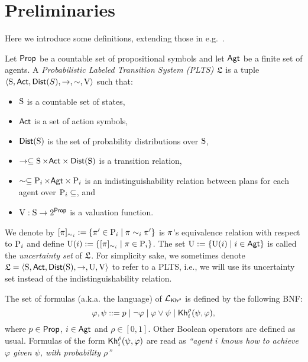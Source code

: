 \section{Preliminaries}
\label{sec:preliminaries}

Here we introduce some definitions, extending those in e.g.~\cite{AFSVQ21}.

\begin{definition}\label{def:plts}
    Let $\PROP$ be a countable set of propositional symbols and let $\AGT$ be a finite set of agents.  
    A \emph{Probabilistic Labeled Transition System (PLTS)} $\model$ is a tuple
    $\tup{\S,\ACT,\dist(S),\ra,\sim,\V}$ such that:
    \begin{itemize}
        \item $\S$ is a countable set of states,
        \item $\ACT$ is a set of action symbols,
        \item $\dist(\S)$ is the set of probability distributions over $\S$,
        \item $\ra \subseteq \S \times \ACT \times \dist(\S)$ is a transition relation,
        \item $\sim\subseteq \DS{i} \times \AGT \times \DS{i}$ is an indistinguishability relation between plans for each agent over $\DS{i}\subseteq$, and
        \item $\V: \S \ra 2^\PROP$ is a valuation function.
    \end{itemize}
    We denote by $[\plan]_{\sim_i}:=\set{\plan' \in \DS{i} \mid \plan \sim_i \plan'}$ is $\plan$'s equivalence relation with respect to $\DS{i}$  and define $\Unc(i) := \set{[\plan]_{\sim_i} \mid \plan\in\DS{i}}$. The set $\Unc:=\set{\Unc(i) \mid i\in\AGT}$ is called the  \emph{uncertainty set} of $\model$. For simplicity sake, we sometimes denote $\model=\tup{\S,\ACT,\dist(\S),\ra,\Unc,\V}$ to refer to a PLTS, i.e., we will use its uncertainty set instead of the indistinguishability relation.
\end{definition}

\begin{definition}
    \label{def:syntax}
    The set of formulas (a.k.a. the language) of $\PKh$ is defined by the following BNF:
    \[
        \varphi, \psi ::= p \mid \neg \varphi \mid \varphi \vee \psi \mid \kh_i^\rho(\psi,\varphi),
    \]
    where $p\in\PROP$, $i\in\AGT$ and $\rho\in[0,1]$. Other Boolean operators are defined as usual. Formulas of the form $\kh_i^\rho(\psi,\varphi)$ are read as \emph{``agent $i$ knows how to achieve $\varphi$ given $\psi$, with probability $\rho$''}
\end{definition}

